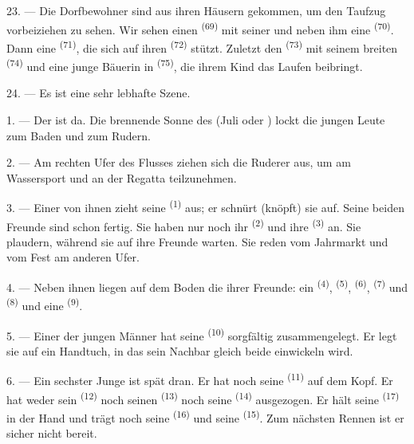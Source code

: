 23. --- Die Dorfbewohner sind aus ihren Häusern gekommen, um den Taufzug
vorbeiziehen zu sehen. Wir sehen einen  \textsuperscript{(69)} mit
seiner  und neben ihm eine 
\textsuperscript{(70)}. Dann eine  \textsuperscript{(71)}, die sich
auf ihren  \textsuperscript{(72)} stützt. Zuletzt den 
\textsuperscript{(73)} mit seinem breiten  \textsuperscript{(74)} und
eine junge Bäuerin in  \textsuperscript{(75)}, die ihrem Kind
das Laufen beibringt.

24. --- Es ist eine sehr lebhafte Szene.
\VUsaut{4.0mm}

\VUsaut{3.0mm}

\VUsaut{2.4mm}

\VUsaut{3.0mm}

1. --- Der  ist da. Die brennende Sonne des 
(Juli oder ) lockt die jungen Leute zum Baden und zum Rudern.

2. --- Am rechten Ufer des Flusses ziehen sich die Ruderer aus, um am Wassersport
und an der Regatta teilzunehmen.

3. --- Einer von ihnen zieht seine  \textsuperscript{(1)} aus; er
schnürt (knöpft) sie auf. Seine beiden Freunde sind schon fertig. Sie haben nur
noch ihr  \textsuperscript{(2)} und ihre 
\textsuperscript{(3)} an. Sie plaudern, während sie auf ihre Freunde warten. Sie
reden vom Jahrmarkt und vom Fest am anderen Ufer.

4. --- Neben ihnen liegen auf dem Boden die  ihrer Freunde: ein
  \textsuperscript{(4)}, 
\textsuperscript{(5)},  \textsuperscript{(6)}, 
\textsuperscript{(7)} und  \textsuperscript{(8)} und eine
 \textsuperscript{(9)}.

5. --- Einer der jungen Männer hat seine  \textsuperscript{(10)}
sorgfältig zusammengelegt. Er legt sie auf ein Handtuch, in das sein Nachbar
gleich beide  einwickeln wird.

6. --- Ein sechster Junge ist spät dran. Er hat noch seine 
\textsuperscript{(11)} auf dem Kopf. Er hat weder sein 
\textsuperscript{(12)} noch seinen  \textsuperscript{(13)} noch seine
 \textsuperscript{(14)} ausgezogen. Er hält seine
 \textsuperscript{(17)} in der Hand und trägt noch seine
 \textsuperscript{(16)} und seine 
\textsuperscript{(15)}. Zum nächsten Rennen ist er sicher nicht bereit.

